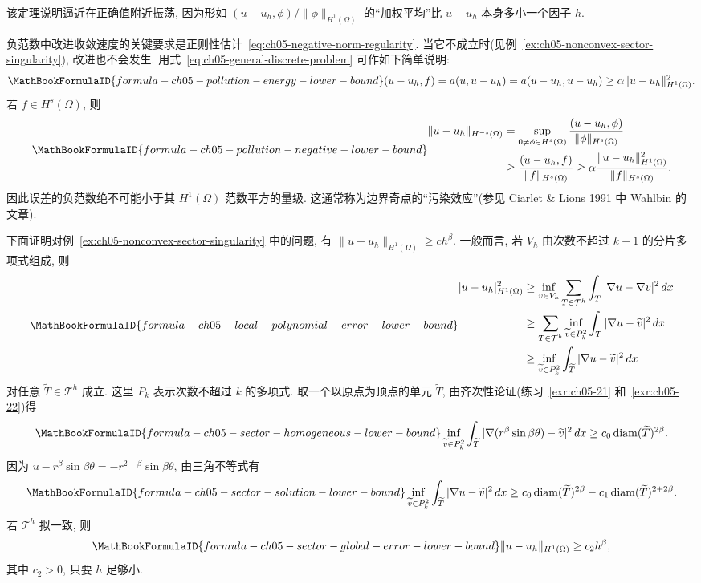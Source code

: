该定理说明逼近在正确值附近振荡, 因为形如 $(u-u_h,\phi)/\|\phi\|_{H^1(\Omega)}$ 的``加权平均''比 $u-u_h$ 本身多小一个因子 $h$.

负范数中改进收敛速度的关键要求是正则性估计~\eqref{eq:ch05-negative-norm-regularity}. 当它不成立时(见例~\ref{ex:ch05-nonconvex-sector-singularity}), 改进也不会发生. 用式~\eqref{eq:ch05-general-discrete-problem} 可作如下简单说明:
\[
\MathBookFormulaID{formula-ch05-pollution-energy-lower-bound}
(u-u_h,f)=a(u,u-u_h)=a(u-u_h,u-u_h)
\geq\alpha\|u-u_h\|_{H^1(\Omega)}^2.
\]
若 $f\in H^s(\Omega)$, 则
\begin{equation}
\MathBookFormulaID{formula-ch05-pollution-negative-lower-bound}
\label{eq:ch05-pollution-negative-lower-bound}
\begin{aligned}
\|u-u_h\|_{H^{-s}(\Omega)}
&=\sup_{0\ne\phi\in H^s(\Omega)}
\frac{(u-u_h,\phi)}{\|\phi\|_{H^s(\Omega)}}\\
&\geq\frac{(u-u_h,f)}{\|f\|_{H^s(\Omega)}}
\geq\alpha\frac{\|u-u_h\|_{H^1(\Omega)}^2}{\|f\|_{H^s(\Omega)}}.
\end{aligned}
\end{equation}
因此误差的负范数绝不可能小于其 $H^1(\Omega)$ 范数平方的量级. 这通常称为边界奇点的``污染效应''(参见 Ciarlet \& Lions 1991 中 Wahlbin 的文章).

下面证明对例~\ref{ex:ch05-nonconvex-sector-singularity} 中的问题, 有 $\|u-u_h\|_{H^1(\Omega)}\geq ch^\beta$. 一般而言, 若 $V_h$ 由次数不超过 $k+1$ 的分片多项式组成, 则
\[
\MathBookFormulaID{formula-ch05-local-polynomial-error-lower-bound}
\begin{aligned}
|u-u_h|_{H^1(\Omega)}^2
&\geq\inf_{v\in V_h}\sum_{T\in\mathcal T^h}\int_T|\nabla u-\nabla v|^2\,dx\\
&\geq\sum_{T\in\mathcal T^h}\inf_{\widetilde v\in P_k^2}
\int_T|\nabla u-\widetilde v|^2\,dx\\
&\geq\inf_{\widetilde v\in P_k^2}\int_{\widetilde T}|\nabla u-\widetilde v|^2\,dx
\end{aligned}
\]
对任意 $\widetilde T\in\mathcal T^h$ 成立. 这里 $P_k$ 表示次数不超过 $k$ 的多项式. 取一个以原点为顶点的单元 $\widetilde T$, 由齐次性论证(练习~\ref{exr:ch05-21} 和~\ref{exr:ch05-22})得
\[
\MathBookFormulaID{formula-ch05-sector-homogeneous-lower-bound}
\inf_{\widetilde v\in P_k^2}\int_{\widetilde T}
|\nabla(r^\beta\sin\beta\theta)-\widetilde v|^2\,dx
\geq c_0\operatorname{diam}(\widetilde T)^{2\beta}.
\]
因为 $u-r^\beta\sin\beta\theta=-r^{2+\beta}\sin\beta\theta$, 由三角不等式有
\[
\MathBookFormulaID{formula-ch05-sector-solution-lower-bound}
\inf_{\widetilde v\in P_k^2}\int_{\widetilde T}|\nabla u-\widetilde v|^2\,dx
\geq c_0\operatorname{diam}(\widetilde T)^{2\beta}
-c_1\operatorname{diam}(\widetilde T)^{2+2\beta}.
\]
若 $\mathcal T^h$ 拟一致, 则
\begin{equation}
\MathBookFormulaID{formula-ch05-sector-global-error-lower-bound}
\label{eq:ch05-sector-global-error-lower-bound}
\|u-u_h\|_{H^1(\Omega)}\geq c_2h^\beta,
\end{equation}
其中 $c_2>0$, 只要 $h$ 足够小.
